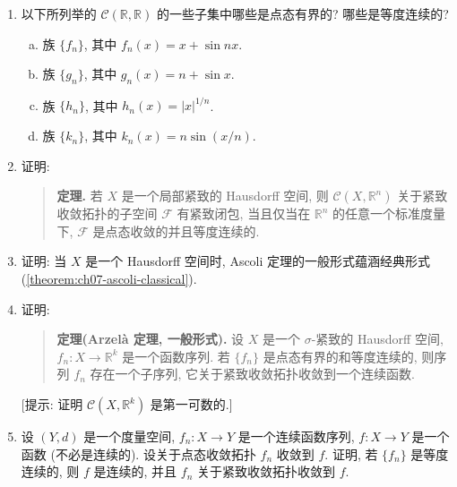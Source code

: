 \documentclass[../../main.tex]{subfiles}
\begin{document}
\begin{enumerate}
\item 以下所列举的 $\mathcal{C}(\mathbb{R},\mathbb{R})$ 的一些子集中哪些是点态有界的? 哪些是等度连续的?
\begin{enumerate}[(a)]
\item 族 $\{f_n\}$, 其中 $f_n(x)=x+\sin nx$.
\item 族 $\{g_n\}$, 其中 $g_n(x)=n+\sin x$.
\item 族 $\{h_n\}$, 其中 $h_n(x)=|x|^{1/n}$.
\item 族 $\{k_n\}$, 其中 $k_n(x)=n\sin(x/n)$.
\end{enumerate}
\item 证明:
\begin{quote}
\textbf{定理.} 若 $X$ 是一个局部紧致的 Hausdorff 空间, 则 $\mathcal{C}(X,\mathbb{R}^n)$ 关于紧致收敛拓扑的子空间 $\mathcal{F}$ 有紧致闭包, 当且仅当在 $\mathbb{R}^n$ 的任意一个标准度量下, $\mathcal{F}$ 是点态收敛的并且等度连续的.
\end{quote}
\item 证明: 当 $X$ 是一个 Hausdorff 空间时, Ascoli 定理的一般形式蕴涵经典形式 (\cref{theorem:ch07-ascoli-classical}).
\item 证明:
\begin{quote}
\textbf{定理(Arzelà 定理, 一般形式).} 设 $X$ 是一个 $\sigma$-紧致的 Hausdorff 空间, $f_n\colon X\to\mathbb{R}^k$ 是一个函数序列. 若 $\{f_n\}$ 是点态有界的和等度连续的, 则序列 $f_n$ 存在一个子序列, 它关于紧致收敛拓扑收敛到一个连续函数.
\end{quote}
[提示: 证明 $\mathcal{C}(X,\mathbb{R}^k)$ 是第一可数的.]
\item 设 $(Y,d)$ 是一个度量空间, $f_n\colon X\to Y$ 是一个连续函数序列, $f\colon X\to Y$ 是一个函数 (不必是连续的). 设关于点态收敛拓扑 $f_n$ 收敛到 $f$. 证明, 若 $\{f_n\}$ 是等度连续的, 则 $f$ 是连续的, 并且 $f_n$ 关于紧致收敛拓扑收敛到 $f$.
\end{enumerate}
\end{document}
